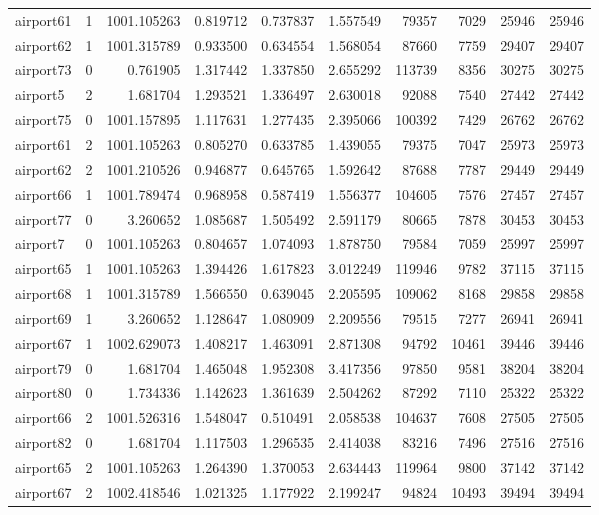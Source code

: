 \begin{longtable}{|l|r|r|r|r|r|r|r|r|r|}
airport61 & 1 & 1001.105263 & 0.819712 & 0.737837 & 1.557549 & 79357 & 7029 & 25946 & 25946 \\
airport62 & 1 & 1001.315789 & 0.933500 & 0.634554 & 1.568054 & 87660 & 7759 & 29407 & 29407 \\
airport73 & 0 & 0.761905 & 1.317442 & 1.337850 & 2.655292 & 113739 & 8356 & 30275 & 30275 \\
airport5 & 2 & 1.681704 & 1.293521 & 1.336497 & 2.630018 & 92088 & 7540 & 27442 & 27442 \\
airport75 & 0 & 1001.157895 & 1.117631 & 1.277435 & 2.395066 & 100392 & 7429 & 26762 & 26762 \\
airport61 & 2 & 1001.105263 & 0.805270 & 0.633785 & 1.439055 & 79375 & 7047 & 25973 & 25973 \\
airport62 & 2 & 1001.210526 & 0.946877 & 0.645765 & 1.592642 & 87688 & 7787 & 29449 & 29449 \\
airport66 & 1 & 1001.789474 & 0.968958 & 0.587419 & 1.556377 & 104605 & 7576 & 27457 & 27457 \\
airport77 & 0 & 3.260652 & 1.085687 & 1.505492 & 2.591179 & 80665 & 7878 & 30453 & 30453 \\
airport7 & 0 & 1001.105263 & 0.804657 & 1.074093 & 1.878750 & 79584 & 7059 & 25997 & 25997 \\
airport65 & 1 & 1001.105263 & 1.394426 & 1.617823 & 3.012249 & 119946 & 9782 & 37115 & 37115 \\
airport68 & 1 & 1001.315789 & 1.566550 & 0.639045 & 2.205595 & 109062 & 8168 & 29858 & 29858 \\
airport69 & 1 & 3.260652 & 1.128647 & 1.080909 & 2.209556 & 79515 & 7277 & 26941 & 26941 \\
airport67 & 1 & 1002.629073 & 1.408217 & 1.463091 & 2.871308 & 94792 & 10461 & 39446 & 39446 \\
airport79 & 0 & 1.681704 & 1.465048 & 1.952308 & 3.417356 & 97850 & 9581 & 38204 & 38204 \\
airport80 & 0 & 1.734336 & 1.142623 & 1.361639 & 2.504262 & 87292 & 7110 & 25322 & 25322 \\
airport66 & 2 & 1001.526316 & 1.548047 & 0.510491 & 2.058538 & 104637 & 7608 & 27505 & 27505 \\
airport82 & 0 & 1.681704 & 1.117503 & 1.296535 & 2.414038 & 83216 & 7496 & 27516 & 27516 \\
airport65 & 2 & 1001.105263 & 1.264390 & 1.370053 & 2.634443 & 119964 & 9800 & 37142 & 37142 \\
airport67 & 2 & 1002.418546 & 1.021325 & 1.177922 & 2.199247 & 94824 & 10493 & 39494 & 39494 \\

\end{longtable}

